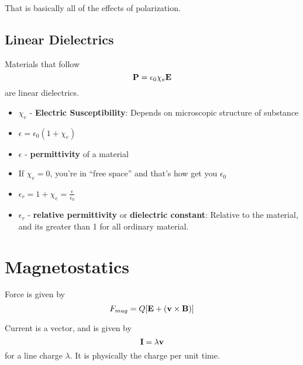 \documentclass{article}
\begin{document}
That is basically all of the effects of polarization.

\subsection{Linear Dielectrics}
Materials that follow 
$$
\vb{P} = \epsilon_0 \chi_e \vb{E}
$$
are linear dielectrics.

\begin{itemize}
    \item $\chi_e$ - \textbf{Electric Susceptibility}: Depends on microscopic structure of substance
    \item $\epsilon = \epsilon_0(1+\chi_e)$
    \item $\epsilon$ - \textbf{permittivity} of a material
    \item If $\chi_e = 0$, you're in ``free space'' and that's how get you $\epsilon_0$
    \item $\epsilon_r = 1 + \chi_e = \frac{\epsilon}{\epsilon_0}$
    \item $\epsilon_r$ - \textbf{relative permittivity} or \textbf{dielectric constant}: Relative to the material, and its greater than 1 for all ordinary material.
\end{itemize}


\section{Magnetostatics}

Force is given by
$$
F_{mag} = Q[\vb{E} + (\vb{v} \times \vb{B})]
$$

Current is a vector, and is given by
$$
\vb{I} = \lambda \vb{v}
$$
for a line charge $\lambda$.  It is physically the charge per unit time.
\end{document}
